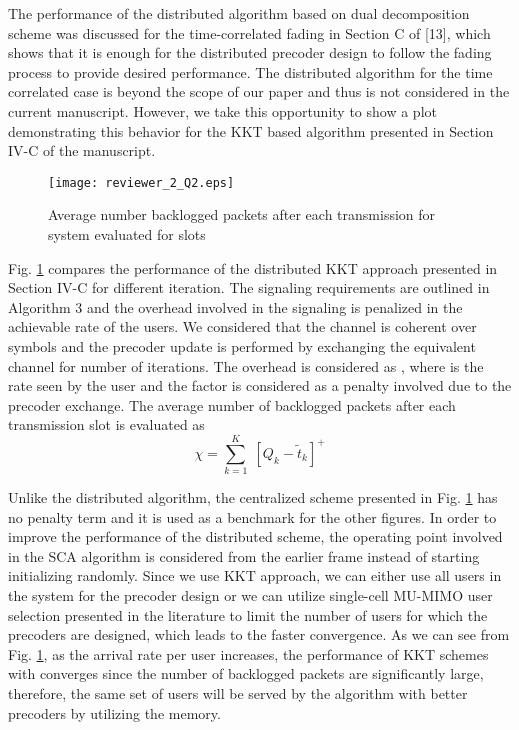 \begin{enumerate}
	The performance of the distributed algorithm based on dual decomposition scheme was discussed for the time-correlated fading in Section C of [13], which shows that it is enough for the distributed precoder design to follow the fading process to provide desired performance. The distributed algorithm for the time correlated case is beyond the scope of our paper and thus is not considered in the current manuscript. However, we take this opportunity to show a plot demonstrating this behavior for the \ac{KKT} based algorithm presented in Section IV-C of the manuscript.
	\begin{figure}[h!]
		\centering
		\texttt{[image: reviewer\_2\_Q2.eps]}
		\caption{Average number backlogged packets after each transmission for system  evaluated for  slots}
		\label{fig-review-2}
	\end{figure}
		
	Fig. \ref{fig-review-2} compares the performance of the distributed \ac{KKT} approach presented in Section IV-C for different iteration. The signaling requirements are outlined in Algorithm 3 and the overhead involved in the signaling is penalized in the achievable rate of the users. We considered that the channel is coherent over  symbols and the precoder update is performed by exchanging the equivalent channel for  number of iterations. The overhead is considered as , where  is the rate seen by the user and the factor  is considered as a penalty involved due to the precoder exchange. The average number of backlogged packets after each transmission slot is evaluated as 
	\begin{equation}
	\chi = \sum_{k = 1}^K \; [ Q_k - \tilde{t}_k ]^+
	\end{equation}
	
	Unlike the distributed algorithm, the centralized scheme presented in Fig. \ref{fig-review-2} has no penalty term and it is used as a benchmark for the other figures. In order to improve the performance of the distributed scheme, the operating point involved in the \ac{SCA} algorithm is considered from the earlier frame instead of starting initializing randomly. Since we use \ac{KKT} approach, we can either use all users in the system for the precoder design or we can utilize single-cell MU-MIMO user selection presented in the literature to limit the number of users for which the precoders are designed, which leads to the faster convergence. As we can see from Fig. \ref{fig-review-2}, as the arrival rate per user increases, the performance of \ac{KKT} schemes with  converges since the number of backlogged packets are significantly large, therefore, the same set of users will be served by the algorithm with better precoders by utilizing the memory. 
	

\end{enumerate}
